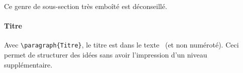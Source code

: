 Ce genre de sous-section très emboîté est déconseillé.

\paragraph{Titre}

Avec \verb/\paragraph{Titre}/, le titre est \og dans le texte \fg\ (et non
numéroté).  Ceci permet de structurer des idées sans avoir
l'impression d'un niveau supplémentaire.


\endinput
